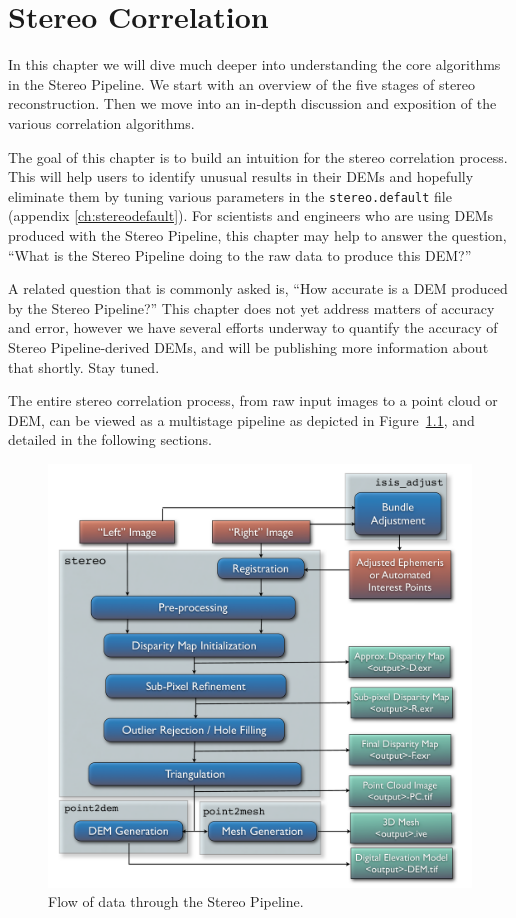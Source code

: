 \chapter{Stereo Correlation}
\label{ch:correlation}

In this chapter we will dive much deeper into understanding the core
algorithms in the Stereo Pipeline.  We start with an overview of the
five stages of stereo reconstruction.  Then we move into an in-depth
discussion and exposition of the various correlation algorithms.

The goal of this chapter is to build an intuition for the stereo
correlation process.  This will help users to identify unusual results
in their \acp{DEM} and hopefully eliminate them by tuning various
parameters in the \texttt{stereo.default} file (appendix
\ref{ch:stereodefault}).  For scientists and
engineers who are using \acp{DEM} produced with the Stereo Pipeline, this
chapter may help to answer the question, ``What is the Stereo Pipeline
doing to the raw data to produce this \ac{DEM}?''

A related question that is commonly asked is, ``How accurate is a \ac{DEM}
produced by the Stereo Pipeline?''  This chapter does not yet address
matters of accuracy and error, however we have several efforts underway
to quantify the accuracy of Stereo Pipeline-derived \acp{DEM}, and will be
publishing more information about that shortly.  Stay tuned.

The entire stereo correlation process, from raw input images to a
point cloud or DEM, can be viewed as a multistage pipeline as depicted
in Figure~\ref{fig:asp}, and detailed in the following sections.

\begin{figure}[tb]
  \centering
  \includegraphics[width=13cm]{images/asp.pdf}
  \caption{Flow of data through the Stereo Pipeline.}
  \label{fig:asp}
\end{figure}

